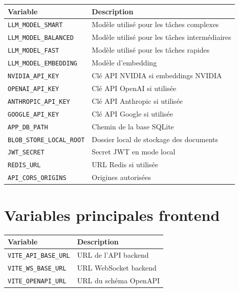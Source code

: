 \documentclass[
  french,
]{report}
\newcounter{none} %
\begin{document}
{\def\LTcaptype{none} %
\begin{longtable}[]{@{}ll@{}}
\toprule\noalign{}
Variable & Description \\
\midrule\noalign{}
\endhead
\bottomrule\noalign{}
\endlastfoot
\texttt{LLM\_MODEL\_SMART} & Modèle utilisé pour les tâches complexes \\
\texttt{LLM\_MODEL\_BALANCED} & Modèle utilisé pour les tâches
intermédiaires \\
\texttt{LLM\_MODEL\_FAST} & Modèle utilisé pour les tâches rapides \\
\texttt{LLM\_MODEL\_EMBEDDING} & Modèle d'embedding \\
\texttt{NVIDIA\_API\_KEY} & Clé API NVIDIA si embeddings NVIDIA \\
\texttt{OPENAI\_API\_KEY} & Clé API OpenAI si utilisée \\
\texttt{ANTHROPIC\_API\_KEY} & Clé API Anthropic si utilisée \\
\texttt{GOOGLE\_API\_KEY} & Clé API Google si utilisée \\
\texttt{APP\_DB\_PATH} & Chemin de la base SQLite \\
\texttt{BLOB\_STORE\_LOCAL\_ROOT} & Dossier local de stockage des
documents \\
\texttt{JWT\_SECRET} & Secret JWT en mode local \\
\texttt{REDIS\_URL} & URL Redis si utilisée \\
\texttt{API\_CORS\_ORIGINS} & Origines autorisées \\
\end{longtable}
}

\section{Variables principales
frontend}\label{variables-principales-frontend}

{\def\LTcaptype{none} %
\begin{longtable}[]{@{}ll@{}}
\toprule\noalign{}
Variable & Description \\
\midrule\noalign{}
\endhead
\bottomrule\noalign{}
\endlastfoot
\texttt{VITE\_API\_BASE\_URL} & URL de l'API backend \\
\texttt{VITE\_WS\_BASE\_URL} & URL WebSocket backend \\
\texttt{VITE\_OPENAPI\_URL} & URL du schéma OpenAPI \\
\end{longtable}
}
\end{document}
